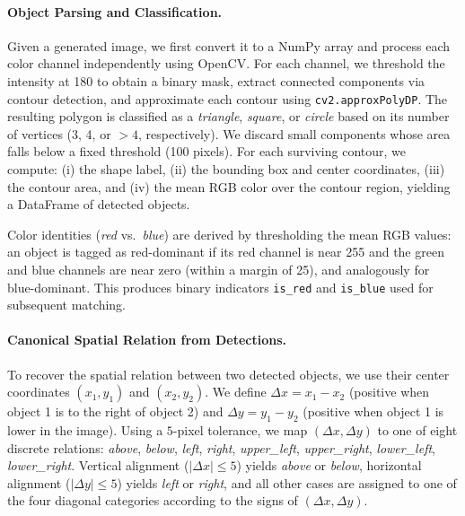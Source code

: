 \documentclass[10pt,twocolumn,letterpaper]{article}
\begin{document}
\paragraph{Object Parsing and Classification.}
Given a generated image, we first convert it to a NumPy array and process each color channel independently using OpenCV. For each channel, we threshold the intensity at 180 to obtain a binary mask, extract connected components via contour detection, and approximate each contour using \texttt{cv2.approxPolyDP}. The resulting polygon is classified as a \emph{triangle}, \emph{square}, or \emph{circle} based on its number of vertices (3, 4, or $>4$, respectively). We discard small components whose area falls below a fixed threshold (100 pixels). For each surviving contour, we compute:
(i) the shape label,
(ii) the bounding box and center coordinates,
(iii) the contour area, and
(iv) the mean RGB color over the contour region, yielding a DataFrame of detected objects.

Color identities (\emph{red} vs.\ \emph{blue}) are derived by thresholding the mean RGB values: an object is tagged as red-dominant if its red channel is near 255 and the green and blue channels are near zero (within a margin of 25), and analogously for blue-dominant. This produces binary indicators \texttt{is\_red} and \texttt{is\_blue} used for subsequent matching.

\paragraph{Canonical Spatial Relation from Detections.}
To recover the spatial relation between two detected objects, we use their center coordinates $(x_1,y_1)$ and $(x_2,y_2)$. We define
$\Delta x = x_1 - x_2$ (positive when object 1 is to the right of object 2) and
$\Delta y = y_1 - y_2$ (positive when object 1 is lower in the image).
Using a $5$-pixel tolerance, we map $(\Delta x,\Delta y)$ to one of eight discrete relations:
\emph{above}, \emph{below}, \emph{left}, \emph{right}, \emph{upper\_left}, \emph{upper\_right}, \emph{lower\_left}, \emph{lower\_right}.
Vertical alignment ($|\Delta x| \le 5$) yields \emph{above} or \emph{below}, horizontal alignment ($|\Delta y| \le 5$) yields \emph{left} or \emph{right}, and all other cases are assigned to one of the four diagonal categories according to the signs of $(\Delta x,\Delta y)$.
\end{document}
